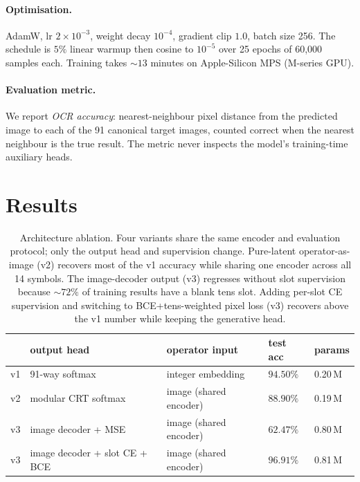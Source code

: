 \documentclass[11pt]{article}
\theoremstyle{papsty}
\begin{document}
\paragraph{Optimisation.}
AdamW, lr $2\!\times\!10^{-3}$, weight decay $10^{-4}$, gradient clip
$1.0$, batch size 256. The schedule is $5\%$ linear warmup then cosine
to $10^{-5}$ over 25 epochs of 60{,}000 samples each. Training takes
$\sim 13$ minutes on Apple-Silicon MPS (M-series GPU).

\paragraph{Evaluation metric.}
We report \emph{OCR accuracy}: nearest-neighbour pixel distance from the
predicted image to each of the 91 canonical target images, counted
correct when the nearest neighbour is the true result. The metric never
inspects the model's training-time auxiliary heads.

\section{Results}
\label{sec:results}

\begin{table}[t]
\centering
\caption{Architecture ablation. Four variants share the same encoder and
  evaluation protocol; only the output head and supervision change.
  Pure-latent operator-as-image (v2) recovers most of the v1 accuracy
  while sharing one encoder across all 14 symbols. The image-decoder
  output (v3) regresses without slot supervision because $\sim 72\%$ of
  training results have a blank tens slot. Adding per-slot CE
  supervision and switching to BCE+tens-weighted pixel loss (v3)
  recovers above the v1 number while keeping the generative head.}
\label{tab:versions}
\small
\begin{tabular}{lllll}
\toprule
 & output head & operator input & test acc & params \\
\midrule
v1 & 91-way softmax & integer embedding & $94.50\%$ & 0.20\,M \\
v2 & modular CRT softmax & image (shared encoder) & $88.90\%$ & 0.19\,M \\
v3 & image decoder + MSE & image (shared encoder) & $62.47\%$ & 0.80\,M \\
v3 & image decoder + slot CE + BCE & image (shared encoder) & $\mathbf{96.91\%}$ & 0.81\,M \\
\bottomrule
\end{tabular}
\end{table}
\end{document}
